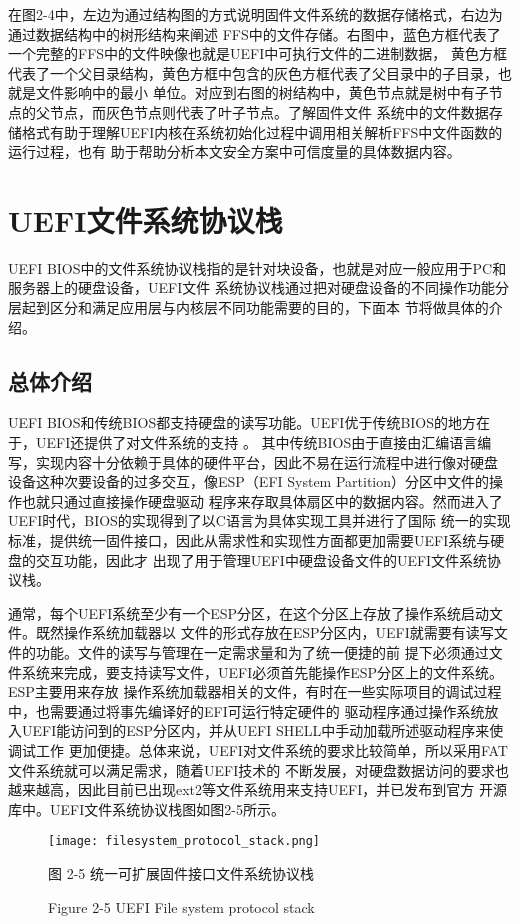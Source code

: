 在图2-4中，左边为通过结构图的方式说明固件文件系统的数据存储格式，右边为通过数据结构中的树形结构来阐述
FFS中的文件存储。右图中，蓝色方框代表了一个完整的FFS中的文件映像也就是UEFI中可执行文件的二进制数据，
黄色方框代表了一个父目录结构，黄色方框中包含的灰色方框代表了父目录中的子目录，也就是文件影响中的最小
单位。对应到右图的树结构中，黄色节点就是树中有子节点的父节点，而灰色节点则代表了叶子节点。了解固件文件
系统中的文件数据存储格式有助于理解UEFI内核在系统初始化过程中调用相关解析FFS中文件函数的运行过程，也有
助于帮助分析本文安全方案中可信度量的具体数据内容。
%
%
\section{UEFI文件系统协议栈}
UEFI BIOS中的文件系统协议栈指的是针对块设备，也就是对应一般应用于PC和服务器上的硬盘设备，UEFI文件
系统协议栈通过把对硬盘设备的不同操作功能分层起到区分和满足应用层与内核层不同功能需要的目的，下面本
节将做具体的介绍。
\subsection{总体介绍}
UEFI BIOS和传统BIOS都支持硬盘的读写功能。UEFI优于传统BIOS的地方在于，UEFI还提供了对文件系统的支持
\cite{english18}。
其中传统BIOS由于直接由汇编语言编写，实现内容十分依赖于具体的硬件平台，因此不易在运行流程中进行像对硬盘
设备这种次要设备的过多交互，像ESP（EFI System Partition）分区中文件的操作也就只通过直接操作硬盘驱动
程序来存取具体扇区中的数据内容。然而进入了UEFI时代，BIOS的实现得到了以C语言为具体实现工具并进行了国际
统一的实现标准，提供统一固件接口，因此从需求性和实现性方面都更加需要UEFI系统与硬盘的交互功能，因此才
出现了用于管理UEFI中硬盘设备文件的UEFI文件系统协议栈。
\par 通常，每个UEFI系统至少有一个ESP分区，在这个分区上存放了操作系统启动文件。既然操作系统加载器以
文件的形式存放在ESP分区内，UEFI就需要有读写文件的功能。文件的读写与管理在一定需求量和为了统一便捷的前
提下必须通过文件系统来完成，要支持读写文件，UEFI必须首先能操作ESP分区上的文件系统。ESP主要用来存放
操作系统加载器相关的文件，有时在一些实际项目的调试过程中，也需要通过将事先编译好的EFI可运行特定硬件的
驱动程序通过操作系统放入UEFI能访问到的ESP分区内，并从UEFI SHELL中手动加载所述驱动程序来使调试工作
更加便捷。总体来说，UEFI对文件系统的要求比较简单，所以采用FAT文件系统就可以满足需求，随着UEFI技术的
不断发展，对硬盘数据访问的要求也越来越高，因此目前已出现ext2等文件系统用来支持UEFI，并已发布到官方
开源库中。UEFI文件系统协议栈图如图2-5所示。

\begin{figure}[htb]
    \vspace{0cm}   
    \setlength{\abovecaptionskip}{0.3cm}  
	\centering
    \texttt{[image: filesystem\_protocol\_stack.png]}
    \caption*{图 2-5 统一可扩展固件接口文件系统协议栈}
    \setlength{\belowcaptionskip}{-0.7cm}
    \caption*{Figure 2-5 UEFI File system protocol stack}
\end{figure}

